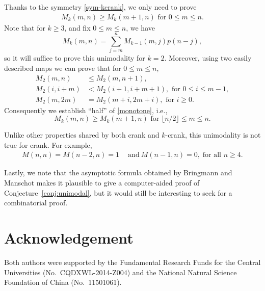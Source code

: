 \documentclass[12pt]{amsart}
\numberwithin{equation}{section}
\theoremstyle{plain}
\theoremstyle{definition}
\begin{document}
\begin{enumerate}[1)]
Thanks to the symmetry \eqref{sym-kcrank}, we only need to prove
\begin{align}\label{monotone}
M_k(m,n)\geq M_k(m+1,n) \text{ for } 0\leq m\leq n.
\end{align}
Note that for $k\geq 3$, and fix $0\leq m \leq n$, we have $$M_{k}(m,n)=\sum_{j=m}^{n}M_{k-1}(m,j)p(n-j),$$ so it will suffice to prove this unimodality for $k=2$. Moreover, using two easily described maps we can prove that for $0\leq m \leq n$,
\begin{align*}
M_2(m,n)&\leq M_2(m,n+1),\\
M_2(i,i+m)&<M_2(i+1,i+m+1), \text{ for } 0\leq i \leq m-1,\\
M_2(m,2m)&=M_2(m+i,2m+i), \text{ for } i \geq 0.
\end{align*}
Consequently we establish ``half'' of \eqref{monotone}, i.e.,
$$M_k(m,n)\geq M_k(m+1,n) \text{ for } \lfloor n/2 \rfloor\leq m\leq n.$$

Unlike other properties shared by both crank and $k$-crank, this unimodality is not true for crank. For example,
\begin{align*}
M(n,n)=M(n-2,n)=1\quad~\textrm{and}~M(n-1,n)=0,\; \text{for all }n\geq 4.
\end{align*}

Lastly, we note that the asymptotic formula obtained by Bringmann and Manschot \cite[Corollary~1.3]{BM} makes it plausible to give a computer-aided proof of Conjecture~\ref{conj:unimodal}, but it would still be interesting to seek for a combinatorial proof.




\end{enumerate}





\section*{Acknowledgement}
Both authors were supported by the Fundamental Research Funds for the Central Universities (No.~CQDXWL-2014-Z004) and the National Natural Science Foundation of China (No.~11501061).
\end{document}
